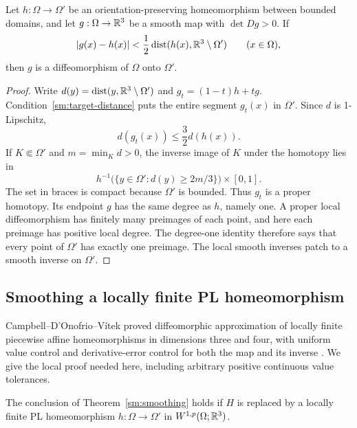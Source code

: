 \begin{lemma}
\label{sm:proper-degree}
Let $h:\Omega\to\Omega'$ be an orientation-preserving homeomorphism
between bounded domains, and let $g:\Omega\to\mathbb R^3$ be a smooth
map with $\det Dg>0$.  If
\begin{equation}
 \label{sm:target-distance}
 |g(x)-h(x)|<\frac12\operatorname{dist}(h(x),\mathbb R^3\setminus\Omega')
 \qquad(x\in\Omega),
\end{equation}
then $g$ is a diffeomorphism of $\Omega$ onto $\Omega'$.
\end{lemma}

\begin{proof}
Write $d(y)=\operatorname{dist}(y,\mathbb R^3\setminus\Omega')$ and
$g_t=(1-t)h+tg$.  Condition~\eqref{sm:target-distance} puts the entire
segment $g_t(x)$ in $\Omega'$.  Since $d$ is 1-Lipschitz,
\[
 d(g_t(x))\le\frac32d(h(x)).
\]
If $K\Subset\Omega'$ and $m=\min_Kd>0$, the inverse image of $K$
under the homotopy lies in
\[
 h^{-1}\bigl(\{y\in\Omega':d(y)\ge2m/3\}\bigr)\times[0,1].
\]
The set in braces is compact because $\Omega'$ is bounded.
Thus $g_t$ is a proper homotopy.  Its endpoint $g$ has the same
degree as $h$, namely one.  A proper local diffeomorphism has
finitely many preimages of each point, and here each preimage has
positive local degree.  The degree-one identity therefore says that
every point of $\Omega'$ has exactly one preimage.  The local smooth
inverses patch to a smooth inverse on $\Omega'$.
\end{proof}

\subsection{Smoothing a locally finite PL homeomorphism}

Campbell--D'Onofrio--V\'itek proved diffeomorphic approximation of
locally finite piecewise affine homeomorphisms in dimensions three
and four, with uniform value control and derivative-error control
for both the map and its inverse
\cite[Theorem~A]{CampbellDOnofrioVitek2026}.
We give the local proof needed here, including arbitrary positive
continuous value tolerances.

\begin{proposition}
\label{sm:pl-smoothing}
The conclusion of Theorem~\ref{sm:smoothing} holds if $H$ is replaced
by a locally finite PL homeomorphism
$h:\Omega\to\Omega'$ in $W^{1,p}(\Omega;\mathbb R^3)$.
\end{proposition}

